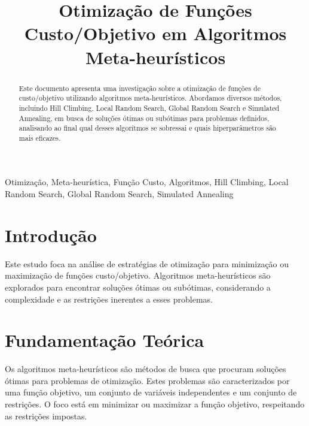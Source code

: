 \documentclass[conference]{IEEEtran}
\begin{document}
\title{Otimização de Funções Custo/Objetivo em Algoritmos Meta-heurísticos}

\author{
}

\maketitle

\begin{abstract}
Este documento apresenta uma investigação sobre a otimização de funções de custo/objetivo utilizando algoritmos meta-heurísticos. Abordamos diversos métodos, incluindo Hill Climbing, Local Random Search, Global Random Search e Simulated Annealing, em busca de soluções ótimas ou subótimas para problemas definidos, analisando ao final qual desses algorítmos se sobressai e quais hiperparâmetros são mais eficazes.
\end{abstract}

\begin{IEEEkeywords}
Otimização, Meta-heurística, Função Custo, Algoritmos, Hill Climbing, Local Random Search, Global Random Search, Simulated Annealing
\end{IEEEkeywords}

\section{Introdução}
Este estudo foca na análise de estratégias de otimização para minimização ou maximização de funções custo/objetivo. Algoritmos meta-heurísticos são explorados para encontrar soluções ótimas ou subótimas, considerando a complexidade e as restrições inerentes a esses problemas. 

\section{Fundamentação Teórica}
Os algoritmos meta-heurísticos são métodos de busca que procuram soluções ótimas para problemas de otimização. Estes problemas são caracterizados por uma função objetivo, um conjunto de variáveis independentes e um conjunto de restrições. O foco está em minimizar ou maximizar a função objetivo, respeitando as restrições impostas.
\end{document}
